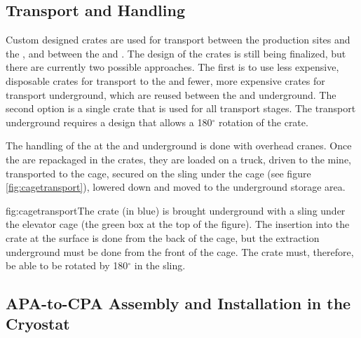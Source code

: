 \subsection{Transport and Handling}
\label{sec:fdsp-apa-install-transport}

Custom designed crates are used for transport between the production sites and the , and between the  and \surf{}. The design of the crates is still being finalized, but there are currently two possible approaches. The first is to use less expensive, disposable crates for transport to the  and fewer, more expensive crates for transport underground, which are reused between the  and underground. The second option is a single crate that is used for all transport stages. The transport underground requires a design that allows a 180$^{\circ}$ rotation of the crate. 


The handling of the  at the  and underground is done with overhead cranes. Once the  are repackaged in the crates, they are loaded on a truck, driven to the mine, transported to the cage, secured on the sling under the cage (see figure \ref{fig:cagetransport}), lowered down and moved to the underground storage area.

\begin{dunefigure}{fig:cagetransport}{The  crate (in blue) is brought underground with a sling under the elevator cage (the green box at the top of the figure). The insertion into the crate at the surface is done from the back of the cage, but the extraction underground must be done from the front of the cage. The  crate must, therefore, be able to be rotated  by 180$^\circ$ in the sling.}
\setlength{\fboxsep}{0pt}
\setlength{\fboxrule}{0.5pt}
\end{dunefigure}


\subsection{APA-to-CPA Assembly and Installation in the Cryostat}
\label{sec:fdsp-apa-install-cryostat}

